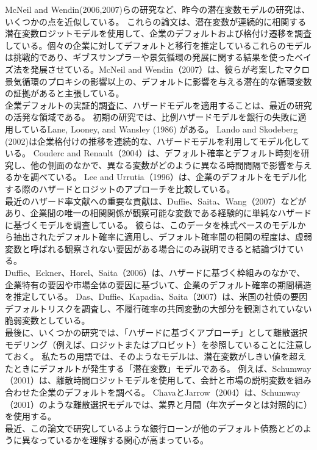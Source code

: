 \documentclass[a4j,12pt]{jarticle}
\begin{document}
\indent McNeil and Wendin(2006,2007)らの研究など、昨今の潜在変数モデルの研究は、いくつかの点を近似している。
これらの論文は、潜在変数が連続的に相関する潜在変数ロジットモデルを使用して、企業のデフォルトおよび格付け遷移を調査している。個々の企業に対してデフォルトと移行を推定しているこれらのモデルは挑戦的であり、ギブスサンプラーや景気循環の発展に関する結果を使ったベイズ法を発展させている。McNeil and Wendin（2007）は、彼らが考案したマクロ景気循環のプロキシの影響以上の、デフォルトに影響を与える潜在的な循環変数の証拠があると主張している。\\
\indent 企業デフォルトの実証的調査に、ハザードモデルを適用することは、最近の研究の活発な領域である。
初期の研究では、比例ハザードモデルを銀行の失敗に適用しているLane, Looney, and Wansley (1986) がある。
 Lando and Skodeberg (2002)は企業格付けの推移を連続的な、ハザードモデルを利用してモデル化している。
Couderc and Renault（2004）は、デフォルト確率とデフォルト時刻を研究し、他の側面のなかで、異なる変数がどのように異なる時間間隔で影響を与えるかを調べている。
Lee and Urrutia（1996）は、企業のデフォルトをモデル化する際のハザードとロジットのアプローチを比較している。\\
\indent 最近のハザード率文献への重要な貢献は、Duffie、Saita、Wang（2007）などがあり、企業間の唯一の相関関係が観察可能な変数である経験的に単純なハザードに基づくモデルを調査している。
彼らは、このデータを株式ベースのモデルから抽出されたデフォルト確率に適用し、デフォルト確率間の相関の程度は、虚弱変数と呼ばれる観察されない要因がある場合にのみ説明できると結論づけている。\\
Duffie、Eckner、Horel、Saita（2006）は、ハザードに基づく枠組みのなかで、企業特有の要因や市場全体の要因に基づいて、企業のデフォルト確率の期間構造を推定している。 Das、Duffie、Kapadia、Saita（2007）は、米国の社債の要因デフォルトリスクを調査し、不履行確率の共同変動の大部分を観測されていない脆弱変数としている。\\
\indent 最後に、いくつかの研究では、「ハザードに基づくアプローチ」として離散選択モデリング（例えば、ロジットまたはプロビット）を参照していることに注意しておく。 私たちの用語では、そのようなモデルは、潜在変数がしきい値を超えたときにデフォルトが発生する「潜在変数」モデルである。 例えば、Schumway（2001）は、離散時間ロジットモデルを使用して、会計と市場の説明変数を組み合わせた企業のデフォルトを調べる。 ChavaとJarrow（2004）は、Schumway（2001）のような離散選択モデルでは、業界と月間（年次データとは対照的に）を使用する。\\
\indent 最近、この論文で研究しているような銀行ローンが他のデフォルト債務とどのように異なっているかを理解する関心が高まっている。
\end{document}
